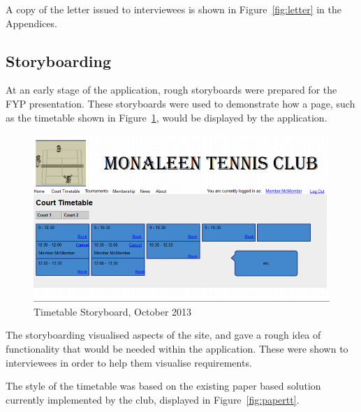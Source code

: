 A copy of the letter issued to interviewees is shown in Figure~\ref{fig:letter} in the Appendices.

\subsection{Storyboarding}

At an early stage of the application, rough storyboards were prepared for the FYP presentation. These storyboards were used to demonstrate how a page, such as the timetable shown in Figure~\ref{fig:timetableSB}, would be displayed by the application. 

\begin{figure}[H]
\begin{center}
\includegraphics[width=14cm]{storyboard.png}
\end{center}
\caption{Timetable Storyboard, October 2013}
\label{fig:timetableSB}
\end{figure}

The storyboarding visualised aspects of the site, and gave a rough idea of functionality that would be needed within the application. These were shown to interviewees in order to help them visualise requirements.

The style of the timetable was based on the existing paper based solution currently implemented by the club, displayed in Figure~\ref{fig:papertt}.

